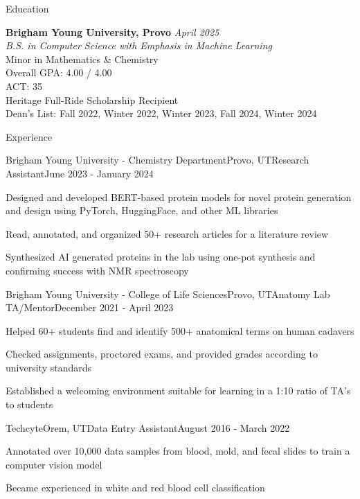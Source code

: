\documentclass[
	10pt,
]{resume}
\begin{document}
\begin{rSection}{Education}
	
	\textbf{Brigham Young University, Provo} \hfill \textit{April 2025} \\ 
	\textit{B.S. in Computer Science with Emphasis in Machine Learning} \\
	Minor in Mathematics \& Chemistry \smallskip \\
	Overall GPA: 4.00 / 4.00 \\
	ACT: 35 \\
	Heritage Full-Ride Scholarship Recipient \\
	Dean's List: Fall 2022, Winter 2022, Winter 2023, Fall 2024, Winter 2024
\end{rSection}

\begin{rSection}{Experience}

	\begin{rSubsection}{Brigham Young University - Chemistry Department}{Provo, UT}{Research Assistant}{June 2023 - January 2024}
		\item Designed and developed BERT-based protein models for novel protein generation and design using PyTorch,
		HuggingFace, and other ML libraries
		\item Read, annotated, and organized 50+ research articles for a literature review
		\item Synthesized AI generated proteins in the lab using one-pot synthesis and confirming success with NMR
		spectroscopy
	\end{rSubsection}


	\begin{rSubsection}{Brigham Young University - College of Life Sciences}{Provo, UT}{Anatomy Lab TA/Mentor}{December 2021 - April 2023}
		\item Helped 60+ students find and identify 500+ anatomical terms on human cadavers
		\item Checked assignments, proctored exams, and provided grades according to university standards
		\item Established a welcoming environment suitable for learning in a 1:10 ratio of TA's to students
	\end{rSubsection}


\begin{rSubsection}{Techcyte}{Orem, UT}{Data Entry Assistant}{August 2016 - March 2022}
		\item Annotated over 10,000 data samples from blood, mold, and fecal slides to train a computer vision model
		\item Became experienced in white and red blood cell classification
	\end{rSubsection}

\end{rSection}
\end{document}
